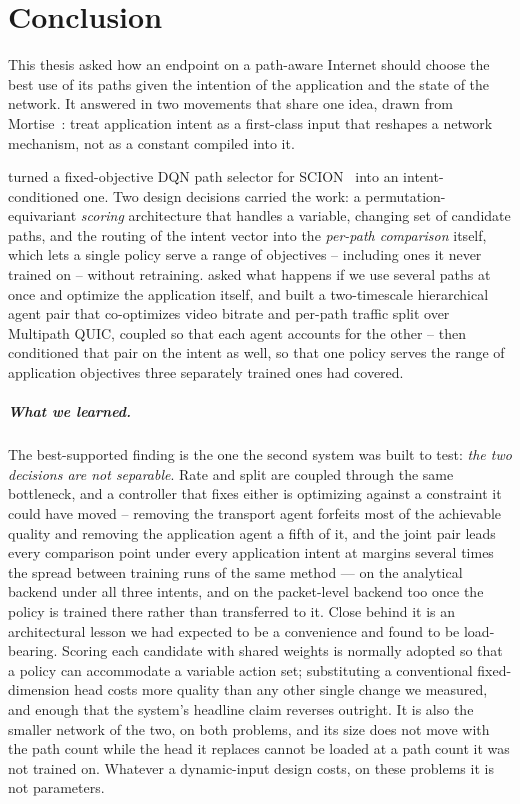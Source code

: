 \chapter{Conclusion}
\label{ch:conclusion}

This thesis asked how an endpoint on a path-aware Internet should choose the best use of its paths given
the intention of the application and the state of the network. It answered in two movements that share one
idea, drawn from Mortise~\cite{Shen2026}: treat application intent as a first-class input that reshapes a
network mechanism, not as a constant compiled into it.

 turned a fixed-objective DQN path selector for SCION~\cite{Bourak2025} into an
intent-conditioned one. Two design decisions carried the work: a permutation-equivariant \emph{scoring}
architecture that handles a variable, changing set of candidate paths, and the routing of the intent vector
into the \emph{per-path comparison} itself, which lets a single policy serve a range of objectives --
including ones it never trained on -- without retraining.  asked what happens if we use several paths at once and optimize the
application itself, and built a
two-timescale hierarchical agent pair that co-optimizes video bitrate and per-path traffic split over
Multipath QUIC, coupled so that each agent accounts for the other -- then conditioned that pair on the
intent as well, so that one policy serves the range of application objectives three separately trained
ones had covered.

\paragraph{What we learned.} The best-supported finding is the one the second system was built to test:
\emph{the two decisions are not separable}. Rate and split are coupled through the same bottleneck, and
a controller that fixes either is optimizing against a constraint it could have moved -- removing the
transport agent forfeits most of the achievable quality and removing the application agent a fifth of
it, and the joint pair leads every comparison point
under every application intent at margins several times the spread between training runs of the same
method --- on the analytical backend under all three intents, and on the packet-level backend too once
the policy is trained there rather than transferred to it. Close behind it is an architectural lesson we had expected to be a convenience and found to be
load-bearing. Scoring each candidate with shared weights is normally adopted so that a policy can
accommodate a variable action set; substituting a conventional fixed-dimension head costs more quality
than any other single change we measured, and enough that the system's headline claim reverses
outright. It is also the smaller network of the two, on both problems, and its size does not move with
the path count while the head it replaces cannot be loaded at a path count it was not trained on.
Whatever a dynamic-input design costs, on these problems it is not parameters.


